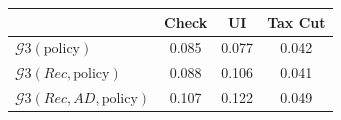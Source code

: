 \begin{tabular}{@{}lccc@{}} 
\toprule 
                          & Check      & UI    & Tax Cut    \\  \midrule 
$\mathcal{G}3(\text{policy})$ & 0.085  & 0.077  & 0.042     \\ 
$\mathcal{G}3(Rec,\text{policy})$ & 0.088  & 0.106  & 0.041     \\ 
$\mathcal{G}3(Rec, AD,\text{policy})$ & 0.107  & 0.122  & 0.049     \\ 
\end{tabular}  
